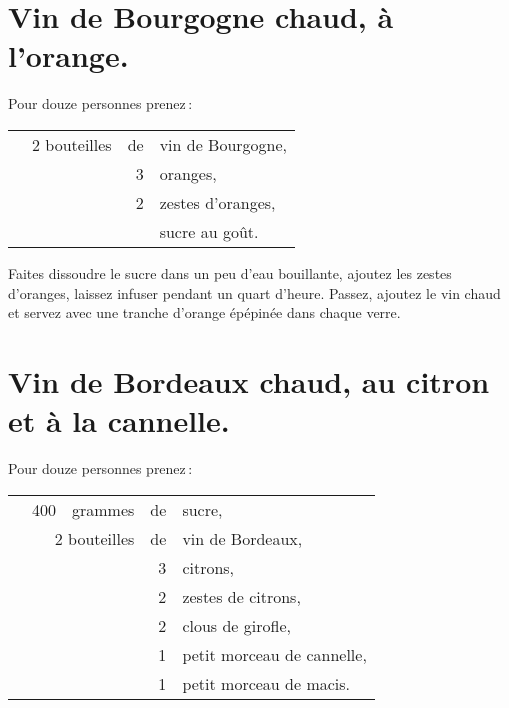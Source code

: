 \section*{\centering Vin de Bourgogne chaud, à l'orange.}
{}

Pour douze personnes prenez :

\footnotesize
\begin{longtable}{rrrrp{16em}}
  & \multicolumn{2}{r}{2 bouteilles} & de & vin de Bourgogne,                                             \\
  &     &         &  3 & oranges,                                                                         \\
  &     &         &  2 & zestes d'oranges,                                                                \\
  &     &         &    & sucre au goût.                                                                   \\
\end{longtable}
\normalsize

Faites dissoudre le sucre dans un peu d'eau bouillante, ajoutez les zestes
d'oranges, laissez infuser pendant un quart d'heure. Passez, ajoutez le vin
chaud et servez avec une tranche d'orange épépinée dans chaque verre.

\section*{\centering Vin de Bordeaux chaud, au citron et à la cannelle.}
{}

Pour douze personnes prenez :

\footnotesize
\begin{longtable}{rrrrp{16em}}
  & 400 & grammes & de & sucre,                                                                           \\
  & \multicolumn{2}{r}{2 bouteilles} & de & vin de Bordeaux,                                              \\
  &     &         &  3 & citrons,                                                                         \\
  &     &         &  2 & zestes de citrons,                                                               \\
  &     &         &  2 & clous de girofle,                                                                \\
  &     &         &  1 & petit morceau de cannelle,                                                       \\
  &     &         &  1 & petit morceau de macis.                                                          \\
\end{longtable}
\normalsize

